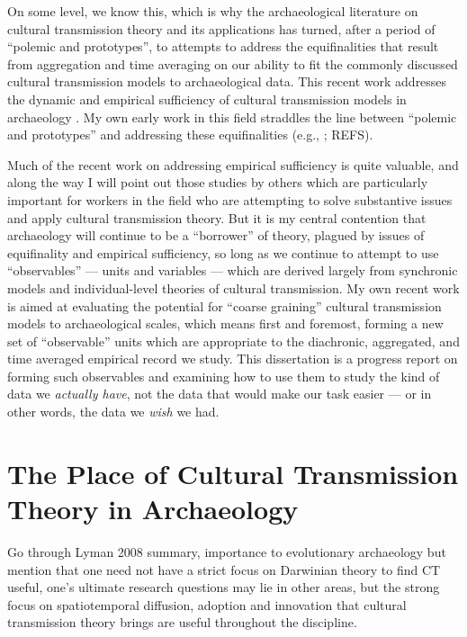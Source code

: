 On some level, we know this, which is why the archaeological literature on cultural transmission theory and its applications has turned, after a period of “polemic and prototypes”, to attempts to address the equifinalities that result from aggregation and time averaging on our ability to fit the commonly discussed cultural transmission models to archaeological data.  This recent work addresses the dynamic and empirical sufficiency of cultural transmission models in archaeology \citep{Lewontin1974}.  My own early work in this field straddles the line between “polemic and prototypes” and addressing these equifinalities (e.g., \citep{Lipo1997}; REFS).    

Much of the recent work on addressing empirical sufficiency is quite valuable, and along the way I will point out those studies by others which are particularly important for workers in the field who are attempting to solve substantive issues and apply cultural transmission theory.  But it is my central contention that archaeology will continue to be a “borrower” of theory, plagued by issues of equifinality and empirical sufficiency, so long as we continue to attempt to use “observables” — units and variables — which are derived largely from synchronic models and individual-level theories of cultural transmission.  My own recent work is aimed at evaluating the potential for “coarse graining” cultural transmission models to archaeological scales, which means first and foremost, forming a new set of “observable” units which are appropriate to the diachronic, aggregated, and time averaged empirical record we study.  This dissertation is a progress report on forming such observables and examining how to use them to study the kind of data we \emph{actually have}, not the data that would make our task easier — or in other words, the data we \emph{wish} we had.  





\section{The Place of Cultural Transmission Theory in Archaeology}
\label{sec:place-ct-in-archy}

Go through Lyman 2008 summary, importance to evolutionary archaeology but mention that one need not have a strict focus on Darwinian theory to find CT useful, one's ultimate research questions may lie in other areas, but the strong focus on spatiotemporal diffusion, adoption and innovation that cultural transmission theory brings are useful throughout the discipline.  





